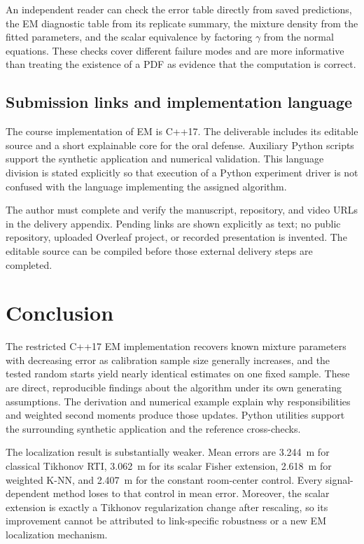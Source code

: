 \documentclass[conference,letterpaper]{IEEEtran}
\begin{document}
An independent reader can check the error table directly from saved predictions, the EM diagnostic table from its replicate summary, the mixture density from the fitted parameters, and the scalar equivalence by factoring $\gamma$ from the normal equations. These checks cover different failure modes and are more informative than treating the existence of a PDF as evidence that the computation is correct.

\subsection{Submission links and implementation language}
The course implementation of EM is C++17. The deliverable includes its editable source and a short explainable core for the oral defense. Auxiliary Python scripts support the synthetic application and numerical validation. This language division is stated explicitly so that execution of a Python experiment driver is not confused with the language implementing the assigned algorithm.

The author must complete and verify the manuscript, repository, and video URLs in the delivery appendix. Pending links are shown explicitly as text; no public repository, uploaded Overleaf project, or recorded presentation is invented. The editable source can be compiled before those external delivery steps are completed.

\section{Conclusion}
The restricted C++17 EM implementation recovers known mixture parameters with decreasing error as calibration sample size generally increases, and the tested random starts yield nearly identical estimates on one fixed sample. These are direct, reproducible findings about the algorithm under its own generating assumptions. The derivation and numerical example explain why responsibilities and weighted second moments produce those updates. Python utilities support the surrounding synthetic application and the reference cross-checks.

The localization result is substantially weaker. Mean errors are 3.244~m for classical Tikhonov RTI, 3.062~m for its scalar Fisher extension, 2.618~m for weighted K-NN, and 2.407~m for the constant room-center control. Every signal-dependent method loses to that control in mean error. Moreover, the scalar extension is exactly a Tikhonov regularization change after rescaling, so its improvement cannot be attributed to link-specific robustness or a new EM localization mechanism.
\end{document}
